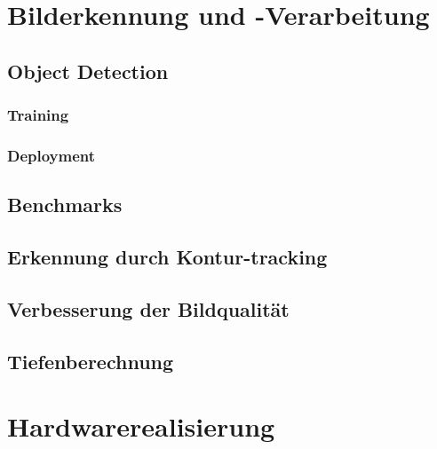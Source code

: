 
\section{Bilderkennung und -Verarbeitung}

\subsection{Object Detection}

\subsubsection{Training}

\subsubsection{Deployment}

\subsection{Benchmarks}

\subsection{Erkennung durch Kontur-tracking}

\subsection{Verbesserung der Bildqualität}

\subsection{Tiefenberechnung}


\section{Hardwarerealisierung}

